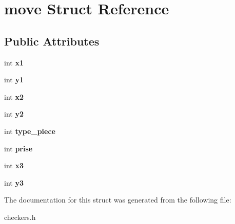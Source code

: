\hypertarget{structmove}{}\section{move Struct Reference}
\label{structmove}
\subsection*{Public Attributes}
\begin{DoxyCompactItemize}
\item 
\mbox{\label{structmove_a82fd358fe29667cebb87096a754b433a}} 
int {\bfseries x1}
\item 
\mbox{\label{structmove_ad8d843eeeadb35673bb508da295433ab}} 
int {\bfseries y1}
\item 
\mbox{\label{structmove_aa9f1f08e972a8bd79a4325dca220127a}} 
int {\bfseries x2}
\item 
\mbox{\label{structmove_ac7da4e07393e4438d4dcddb7cd7e3377}} 
int {\bfseries y2}
\item 
\mbox{\label{structmove_abdb263d0a792f735f3c1c490573a7e4e}} 
int {\bfseries type\+\_\+piece}
\item 
\mbox{\label{structmove_a03b45f81cd9e8e87ba9cfe9bafdb4066}} 
int {\bfseries prise}
\item 
\mbox{\label{structmove_a9222355305b5612b700a366d71995f58}} 
int {\bfseries x3}
\item 
\mbox{\label{structmove_a26f2b3d8c49986724741783bfb346582}} 
int {\bfseries y3}
\end{DoxyCompactItemize}


The documentation for this struct was generated from the following file\+:\begin{DoxyCompactItemize}
\item 
checkers.\+h\end{DoxyCompactItemize}
